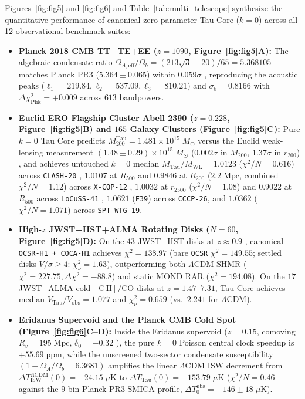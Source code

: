 \documentclass[11pt,a4paper]{article}
\begin{document}
Figures~\ref{fig:fig5} and \ref{fig:fig6} and Table~\ref{tab:multi_telescope} synthesize the quantitative performance of canonical zero-parameter Tau Core ($k = 0$) across all 12 observational benchmark suites:
\begin{itemize}
  \item \textbf{Planck 2018 CMB TT+TE+EE ($z = 1090$, Figure~\ref{fig:fig5}A):} The algebraic condensate ratio $\Omega_{A,\mathrm{eff}}/\Omega_b = (213\sqrt{3}-20)/65 = 5.368105$ matches Planck PR3 ($5.364 \pm 0.065$) within $0.059\sigma$ \cite{Planck2018VI}, reproducing the acoustic peaks ($\ell_1 = 219.84, \ell_2 = 537.09, \ell_3 = 810.21$) and $\sigma_8 = 0.8166$ with $\Delta\chi^2_{\mathrm{Plik}} = +0.009$ across $613$ bandpowers.
  \item \textbf{Euclid ERO Flagship Cluster Abell 2390 ($z = 0.228$, Figure~\ref{fig:fig5}B) and $165$ Galaxy Clusters (Figure~\ref{fig:fig5}C):} Pure $k = 0$ Tau Core predicts $M_{200}^{\mathrm{Tau}} = 1.481 \times 10^{15}\;M_\odot$ versus the Euclid weak-lensing measurement $(1.48 \pm 0.29)\times 10^{15}\;M_\odot$ ($0.002\sigma$ in $M_{200}$, $1.37\sigma$ in $r_{200}$) \cite{EuclidEROAbell2390}, and achieves untouched $k = 0$ median $M_{\mathrm{Tau}}/M_{\mathrm{WL}} = 1.0123$ ($\chi^2/N = 0.616$) across \texttt{CLASH-20} \cite{Umetsu2016CLASH}, $1.0107$ at $R_{500}$ and $0.9846$ at $R_{200}$ ($2.2\;\mathrm{Mpc}$, combined $\chi^2/N = 1.12$) across \texttt{X-COP-12} \cite{Eckert2019XCOP}, $1.0032$ at $r_{2500}$ ($\chi^2/N = 1.08$) and $0.9022$ at $R_{500}$ across \texttt{LoCuSS-41} \cite{OkabeSmith2016LoCuSS}, $1.0621$ (\texttt{F39}) across \texttt{CCCP-26}, and $1.0362$ ($\chi^2/N = 1.071$) across \texttt{SPT-WTG-19}.
  \item \textbf{High-$z$ JWST+HST+ALMA Rotating Disks ($N = 60$, Figure~\ref{fig:fig5}D):} On the $43$ JWST+HST disks at $z \approx 0.9$ \cite{ManceraPina2025}, canonical \texttt{OCSR-H1 + COCA-H1} achieves $\chi^2 = 138.97$ (bare \texttt{OCSR} $\chi^2 = 149.55$; settled disks $V/\sigma \ge 4$: $\chi^2_\nu = 1.63$), outperforming both $\Lambda\mathrm{CDM}$ SHMR ($\chi^2 = 227.75, \Delta\chi^2 = -88.8$) and static MOND RAR ($\chi^2 = 194.08$). On the $17$ JWST+ALMA cold $[\mathrm{C\,II}]/\mathrm{CO}$ disks at $z = 1.47\text{--}7.31$, Tau Core achieves median $V_{\mathrm{Tau}}/V_{\mathrm{obs}} = 1.077$ and $\chi^2_\nu = 0.659$ (vs.\ $2.241$ for $\Lambda\mathrm{CDM}$).
  \item \textbf{Eridanus Supervoid and the Planck CMB Cold Spot (Figure~\ref{fig:fig6}C--D):} Inside the Eridanus supervoid ($z = 0.15$, comoving $R_v = 195\;\mathrm{Mpc}$, $\delta_0 = -0.32$ \cite{Kovacs2022Eridanus}), the pure $k = 0$ Poisson central clock speedup is $+55.69\;\mathrm{ppm}$, while the unscreened two-sector condensate susceptibility $(1 + \Omega_A/\Omega_b = 6.3681)$ amplifies the linear $\Lambda\mathrm{CDM}$ ISW decrement from $\Delta T_{\mathrm{ISW}}^{\Lambda\mathrm{CDM}}(0) = -24.15\;\mu\mathrm{K}$ to $\Delta T_{\mathrm{Tau}}(0) = -153.79\;\mu\mathrm{K}$ ($\chi^2/N = 0.46$ against the 9-bin Planck PR3 SMICA profile, $\Delta T_0^{\mathrm{obs}} = -146 \pm 18\;\mu\mathrm{K}$).
\end{itemize}
\end{document}
